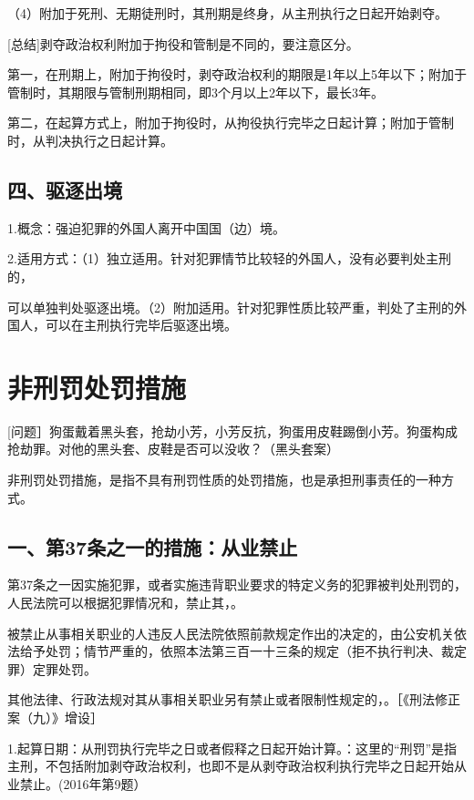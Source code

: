 （4）附加于死刑、无期徒刑时，其刑期是终身，从主刑执行之日起开始剥夺。

[总结]剥夺政治权利附加于拘役和管制是不同的，要注意区分。

第一，在刑期上，附加于拘役时，剥夺政治权利的期限是1年以上5年以下；附加于管制时，其期限与管制刑期相同，即3个月以上2年以下，最长3年。

第二，在起算方式上，附加于拘役时，从拘役执行完毕之日起计算；附加于管制时，从判决执行之日起计算。

\subsection*{四、驱逐出境}

1.概念：强迫犯罪的外国人离开中国国（边）境。

2.适用方式：（1）独立适用。针对犯罪情节比较轻的外国人，没有必要判处主刑的，

可以单独判处驱逐出境。（2）附加适用。针对犯罪性质比较严重，判处了主刑的外国人，可以在主刑执行完毕后驱逐出境。

\section{非刑罚处罚措施}

[问题］狗蛋戴着黑头套，抢劫小芳，小芳反抗，狗蛋用皮鞋踢倒小芳。狗蛋构成抢劫罪。对他的黑头套、皮鞋是否可以没收？（黑头套案）

非刑罚处罚措施，是指不具有刑罚性质的处罚措施，也是承担刑事责任的一种方式。

\subsection*{一、第37条之一的措施：从业禁止}

第37条之一因实施犯罪，或者实施违背职业要求的特定义务的犯罪被判处刑罚的，人民法院可以根据犯罪情况和，禁止其，。

被禁止从事相关职业的人违反人民法院依照前款规定作出的决定的，由公安机关依法给予处罚；情节严重的，依照本法第三百一十三条的规定（拒不执行判决、裁定罪）定罪处罚。

其他法律、行政法规对其从事相关职业另有禁止或者限制性规定的，。［《刑法修正案（九）》增设］

1.起算日期：从刑罚执行完毕之日或者假释之日起开始计算。：这里的“刑罚”是指主刑，不包括附加剥夺政治权利，也即不是从剥夺政治权利执行完毕之日起开始从业禁止。(2016年第9题）

